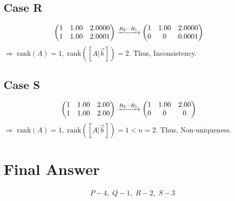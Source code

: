 \documentclass[12pt]{article}
\begin{document}
\subsection*{Case R}
\begin{align}
\begin{pmatrix}1 & 1.00 & 2.0000 \\ 1 & 1.00 & 2.0001\end{pmatrix}
&\xrightarrow{R_2 - R_1}
\begin{pmatrix}1 & 1.00 & 2.0000 \\ 0 & 0 & 0.0001\end{pmatrix}
\end{align}
$\Rightarrow \; \text{rank}(A)=1, \;\text{rank}([A|\vec{b}])=2$.  
Thus, Inconsistency.

\subsection*{Case S}
\begin{align}
\begin{pmatrix}1 & 1.00 & 2.00 \\ 1 & 1.00 & 2.00\end{pmatrix}
&\xrightarrow{R_2 - R_1}
\begin{pmatrix}1 & 1.00 & 2.00 \\ 0 & 0 & 0\end{pmatrix}
\end{align}
$\Rightarrow \; \text{rank}(A)=1, \;\text{rank}([A|\vec{b}])=1 < n=2$.  
Thus, Non-uniqueness.

\section*{Final Answer}
\begin{align}
\boxed{P-4,\; Q-1,\; R-2,\; S-3}
\end{align}
\end{document}
